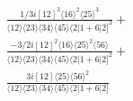 \documentclass[varwidth, border=5pt]{standalone}
\begin{document}
\begin{my}
$\begin{gathered}
\scriptscriptstyle\frac{1/3i[12]^3\langle16\rangle^2\langle25\rangle^3}{\langle12\rangle\langle23\rangle\langle34\rangle\langle45\rangle\langle2|1+6|2]^3}+\\
\scriptscriptstyle\frac{-3/2i[12]^2\langle16\rangle\langle25\rangle^2\langle56\rangle}{\langle12\rangle\langle23\rangle\langle34\rangle\langle45\rangle\langle2|1+6|2]^2}+\\
\scriptscriptstyle\frac{3i[12]\langle25\rangle\langle56\rangle^2}{\langle12\rangle\langle23\rangle\langle34\rangle\langle45\rangle\langle2|1+6|2]}\phantom{+}
\end{gathered}$
\end{my}
\end{document}
